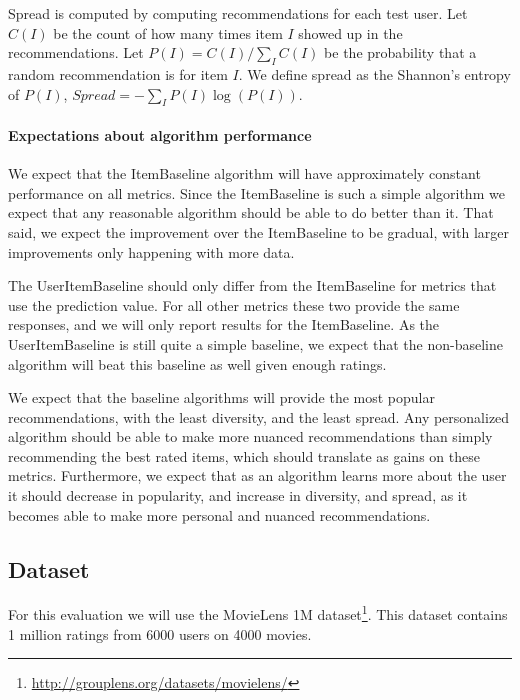 \documentclass[letterpaper]{sig-alternate}
\begin{document}
  Spread is computed by computing recommendations for each test user.
  Let $C(I)$ be the count of how many times item $I$ showed up in the recommendations.
  Let $P(I) = C(I) / \sum_I C(I)$ be the probability that a random recommendation is for item $I$.
  We define spread as the Shannon's entropy of $P(I)$, $Spread = -\sum_I P(I) \log(P(I))$.

  \paragraph{Expectations about algorithm performance}
  We expect that the ItemBaseline algorithm will have approximately constant performance on all metrics.
  Since the ItemBaseline is such a simple algorithm we expect that any reasonable algorithm should be able to do better than it.
  That said, we expect the improvement over the ItemBaseline to be gradual, with larger improvements only happening with more data.

  The UserItemBaseline should only differ from the ItemBaseline for metrics that use the prediction value.
  For all other metrics these two provide the same responses, and we will only report results for the ItemBaseline.
  As the UserItemBaseline is still quite a simple baseline, we expect that the non-baseline algorithm will beat this baseline as well given enough ratings.
  
  We expect that the baseline algorithms will provide the most popular recommendations, with the least diversity, and the least spread.
  Any personalized algorithm should be able to make more nuanced recommendations than simply recommending the best rated items, which should translate as gains on these metrics.
  Furthermore, we expect that as an algorithm learns more about the user it should decrease in popularity, and increase in diversity, and spread, as it becomes able to make more personal and nuanced recommendations.


  \subsection*{Dataset}

  For this evaluation we will use the MovieLens 1M dataset\footnote{\url{http://grouplens.org/datasets/movielens/}}.
  This dataset contains 1 million ratings from 6000 users on 4000 movies.
  
\end{document}

